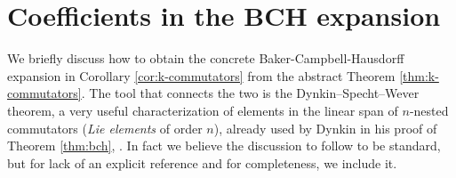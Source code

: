 \documentclass[11pt]{amsart}
\theoremstyle{plain}
\theoremstyle{remark}
\numberwithin{equation}{section}
\begin{document}
\appendix




\section{Coefficients in the BCH expansion} \label{appendix:bch}

We briefly discuss how to obtain the concrete Baker-Campbell-Hausdorff expansion in Corollary \ref{cor:k-commutators} from the abstract Theorem \ref{thm:k-commutators}. 
The tool that connects the two is the Dynkin--Specht--Wever theorem, a very useful characterization of
elements in the linear span of $n$-nested commutators (\textit{Lie elements} of order $n$), already used by Dynkin in his proof of Theorem \ref{thm:bch}, \cite{Dyn}.
In fact we believe the discussion to follow to be standard, but for lack of an explicit reference and for completeness, we include it. 
\end{document}
